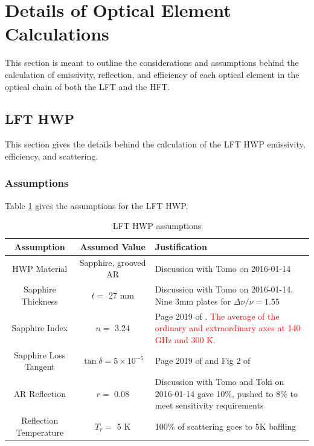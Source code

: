 \documentclass[12pt, titlepage]{article} %
\begin{document}
\newpage

\section{Details of Optical Element Calculations \label{sec:optElemCalc}}

This section is meant to outline the considerations and assumptions behind the calculation of emissivity, reflection, and efficiency of each optical element in the optical chain of both the LFT and the HFT. 


\subsection{LFT HWP}

This section gives the details behind the calculation of the LFT HWP emissivity, efficiency, and scattering.


\subsubsection{Assumptions}

Table \ref{table:lftHwpAssmp} gives the assumptions for the LFT HWP.

\begin{table}[H]
	\centering
	\begin{tabularx}{\textwidth}{|| c | c | X ||}
	\hline
	Assumption & Assumed Value & Justification \\
	\hline
	\hline
	HWP Material & Sapphire, grooved AR & Discussion with Tomo on 2016-01-14 \\
	\hline
	Sapphire Thickness & $t =$ 27 mm & Discussion with Tomo on 2016-01-14. Nine 3mm plates for $\Delta \nu / \nu = 1.55$ \\
	\hline
	Sapphire Index & $n =$ 3.24 & Page 2019 of \cite{lamb}. \textcolor{red}{The average of the ordinary and extraordinary axes at 140 GHz and 300 K.} \\
	\hline
	Sapphire Loss Tangent & $\tan{\delta} = \mathrm{5 \times 10^{-5}}$ & Page 2019 of \cite{lamb} and Fig 2 of \cite{parshin} \\
	\hline
	AR Reflection & $r =$ 0.08 & Discussion with Tomo and Toki on 2016-01-14 gave 10\%, pushed to 8\% to meet sensitivity requirements \\
	\hline
	Reflection Temperature & $T_{r} =$ 5 K & 100\% of scattering goes to 5K baffling \\
	\hline
	\end{tabularx}
\caption{LFT HWP assumptions \label{table:lftHwpAssmp}}
\end{table}
\end{document}
